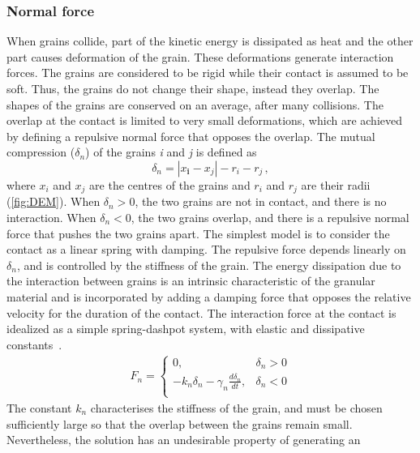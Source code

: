 \subsubsection*{Normal force}
When grains collide, part of the kinetic energy is dissipated as 
heat and the other part causes deformation of the grain. These deformations 
generate interaction forces. The grains are considered to be rigid while their 
contact is assumed to be soft. Thus, the grains do not change their shape, 
instead they overlap. The shapes of the grains are conserved on an average, 
after many collisions. The overlap at the contact is limited to very small 
deformations, which are achieved by defining a repulsive normal force that 
opposes the overlap. The mutual compression ($\delta_{n}$) of the grains 
\textit{i} and \textit{j} is defined as
%
\begin{equation}
 \delta_{n}=\left|x_{\mathbf{i}}-x_{\mathit{j}}\right|-r_{i}-r_{j} \,,
\label{eq:delta}
\end{equation}
%
where $x_{\mathit{i}}$ and $x_{\mathit{j}}$ are the centres of the grains and  
$r_{\mathit{i}}$ and $r_{\mathit{j}}$ are their radii (\cref{fig:DEM}). When 
$\delta_{n}>0$, the two grains are not in contact, and 
there is no interaction. When $\delta_{n}<0$, the two grains overlap, and 
there is a repulsive normal force that pushes the two grains apart. The 
simplest model is to consider the contact as a linear spring with damping. The 
repulsive force depends linearly on $\delta_{n}$, and is controlled by the 
stiffness of the grain. The energy dissipation due to the interaction between 
grains is an intrinsic characteristic of the granular material and is 
incorporated by adding a damping force that opposes the relative velocity for 
the duration of the contact. The interaction force at the contact is idealized 
as a simple spring-dashpot system, with elastic and dissipative 
constants~\citep{Luding1994}. 
%
\begin{align}
 {{F}_{n}}=
\begin{cases}
0, & {{\delta}_{n}}>0 \\
-{{k}_{n}}{{\delta}_{n}}-{{\gamma}_{n}}\frac{d{{\delta}_{n}}}{dt}, & 
{{\delta}_{n}}<0 \\
\end{cases}
\end{align} 
%
The constant ${k}_{n}$ characterises the stiffness of the grain, and must be 
chosen sufficiently large so that the overlap between the grains remain small. 
Nevertheless, the solution has an undesirable property of generating an 
